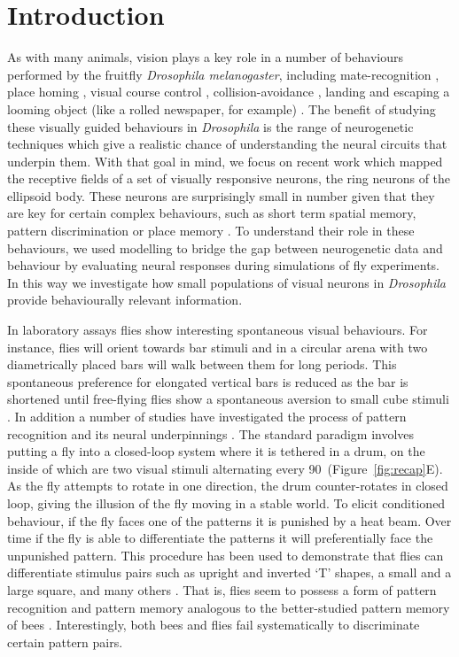 \documentclass[10pt]{article}
\begin{document}
\section*{Introduction}
As with many animals, vision plays a key role in a number of behaviours performed by the fruitfly \emph{Drosophila melanogaster}, including mate-recognition \cite{Agrawal2014}, place homing \cite{Ofstad2011}, visual course control \cite{Borst2014}, collision-avoidance \cite{Tammero2002}, landing \cite{Tammero2002} and escaping a looming object (like a rolled newspaper, for example) \cite{Card2008}. The benefit of studying these visually guided behaviours in \emph{Drosophila} is the range of neurogenetic techniques which give a realistic chance of understanding the neural circuits that underpin them. With that goal in mind, we focus on recent work \cite{Seelig2013} which mapped the receptive fields of a set of visually responsive neurons, the ring neurons of the ellipsoid body. These neurons are surprisingly small in number given that they are key for certain complex behaviours, such as short term spatial memory, pattern discrimination or place memory \cite{Liu2006,Neuser2008,Seelig2015}. To understand their role in these behaviours, we used modelling to bridge the gap between neurogenetic data and behaviour by evaluating neural responses during simulations of fly experiments. In this way we investigate how small populations of visual neurons in \emph{Drosophila} provide behaviourally relevant information.

In laboratory assays flies show interesting spontaneous visual behaviours. For instance, flies will orient towards bar stimuli \cite{Reichardt1969,Gotz1987} and in a circular arena with two diametrically placed bars will walk between them for long periods. This spontaneous preference for elongated vertical bars is reduced as the bar is shortened until free-flying flies show a spontaneous aversion to small cube stimuli \cite{Maimon2008}. In addition a number of studies have investigated the process of pattern recognition and its neural underpinnings \cite{Ernst1999,Liu2006,Pan2009}. The standard paradigm involves putting a fly into a closed-loop system where it is tethered in a drum, on the inside of which are two visual stimuli alternating every 90\degree\ (Figure~\ref{fig:recap}E). As the fly attempts to rotate in one direction, the drum counter-rotates in closed loop, giving the illusion of the fly moving in a stable world. To elicit conditioned behaviour, if the fly faces one of the patterns it is punished by a heat beam. Over time if the fly is able to differentiate the patterns it will preferentially face the unpunished pattern. This procedure has been used to demonstrate that flies can differentiate stimulus pairs such as upright and inverted `T' shapes, a small and a large square, and many others \cite{Ernst1999}. That is, flies seem to possess a form of pattern recognition and pattern memory analogous to the better-studied pattern memory of bees \cite{vonFrisch1914,Giurfa1997,Horridge2009}. Interestingly, both bees and flies fail systematically to discriminate certain pattern pairs. 
\end{document}
